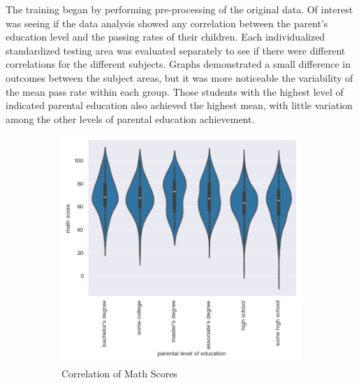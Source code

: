 \documentclass[man,12pt]{apa6} %
\begin{document}
The training began by performing pre-processing of the original data. Of interest was seeing if the data analysis showed any correlation between the parent's education level and the passing rates of their children. Each individualized standardized testing area was evaluated separately to see if there were different correlations for the different subjects. Graphs demonstrated a small difference in outcomes between the subject areas, but it was more noticeable the variability of the mean pass rate within each group. Those students with the highest level of indicated parental education also achieved the highest mean, with little variation among the other levels of parental education achievement.
\begin{figure}[h!]
    \centering
    \caption{Correlations of Parent Education to Student Subject Scores}
    \begin{subfigure}{0.3\textwidth}
    \includegraphics[width=\linewidth]{MathVsParent.png}
    \caption{Correlation of Math Scores}
    \label{fig:view}
    \end{subfigure}
    \begin{subfigure}{0.3\textwidth}

\end{subfigure}
\end{figure}
\end{document}
